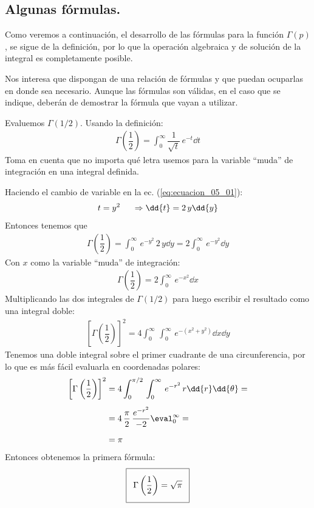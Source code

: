 \subsection{Algunas fórmulas.}
Como veremos a continuación, el desarrollo de las fórmulas para la función $\Gamma (p)$, se sigue de la definición, por lo que la operación algebraica y de solución de la integral es completamente posible.
\par
Nos interesa que dispongan de una relación de fórmulas y que puedan ocuparlas en donde sea necesario. Aunque las fórmulas son válidas, en el caso que se indique, deberán de demostrar la fórmula que vayan a utilizar.
\par 
Evaluemos $\Gamma (1/2)$. Usando la definición:
\begin{align}
\Gamma \left( \dfrac{1}{2}\right) = \int_{0}^{\infty} \dfrac{1}{\sqrt{t}} \, e^{-t} \dd{t}
\label{eq:ecuacion_05_01}
\end{align}
Toma en cuenta que no importa qué letra usemos para la variable \enquote{muda} de integración en una integral definida.
\par
Haciendo el cambio de variable en la ec. (\ref{eq:ecuacion_05_01}):
\begin{align*}
t = y^{2} \hspace{0.5cm} \Rightarrow \dd{t} = 2 \, y \dd{y}
\end{align*}
Entonces tenemos que
\begin{align*}
\Gamma \left( \dfrac{1}{2} \right) = \int_{0}^{\infty} \, e^{-y^{2}} \, 2 \, y \dd{y} = 2 \int_{0}^{\infty} \, e^{-y^{2}} \dd{y}
\end{align*}
Con $x$ como la variable \enquote{muda} de integración:
\begin{align}
\Gamma \left( \dfrac{1}{2} \right) = 2 \int_{0}^{\infty} \, e^{-x^{2}} \dd{x}
\label{eq:ecuacion_05_02}
\end{align}
Multiplicando las dos integrales de $\Gamma (1/2)$ para luego escribir el resultado como una integral doble:
\begin{align*}
\left[ \Gamma \left( \dfrac{1}{2} \right) \right]^{2} = 4 \int_{0}^{\infty} \, \int_{0}^{\infty} \, e^{-(x^{2} + y^{2})} \dd{x} \dd{y}
\end{align*}
Tenemos una doble integral sobre el primer cuadrante de una circunferencia, por lo que es más fácil evaluarla en coordenadas polares:
\begin{align*}
\left[ \Gamma \left( \dfrac{1}{2} \right) \right]^{2} &= 4 \int_{0}^{\pi/2} \, \int_{0}^{\infty} \, e^{-r^{2}} \, r \dd{r} \dd{\theta} = \\[0.5em]
&= 4 \, \dfrac{\pi}{2} \, \dfrac{e^{-r^{2}}}{-2}\eval_{0}^{\infty} = \\[0.5em]
&= \pi
\end{align*}
Entonces obtenemos la primera fórmula:
\begin{align}\addtolength{\fboxsep}{5pt}\boxed{
\Gamma \left( \dfrac{1}{2} \right) = \sqrt{\pi}}
\label{eq:ecuacion_05_03}
\end{align}

